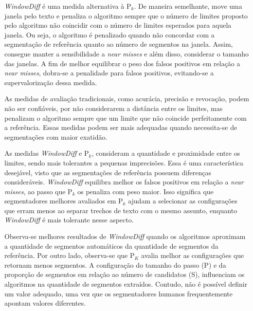 \textit{WindowDiff} é uma medida alternativa à P$_k$. %
De maneira semelhante, move uma janela pelo texto e penaliza o algoritmo sempre que o número de limites proposto pelo algoritmo não coincidir com o número de limites esperados para aquela janela. Ou seja, o algoritmo é penalizado quando não concordar com a segmentação de referência quanto ao número de segmentos na janela.  Assim, consegue manter a sensibilidade a \textit{near misses} e além disso, considerar o tamanho das janelas.  A fim de melhor equilibrar o peso dos falsos positivos em relação a \textit{near misses}, dobra-se a penalidade para falsos positivos, evitando-se a supervalorização dessa medida. 







As medidas de avaliação tradicionais, como acurácia, precisão e revocação, podem não ser confiáveis, por não considerarem a distância entre os limites, mas penalizam o algoritmo sempre que um limite que não coincide perfeitamente com a referência. Essas medidas podem ser mais adequadas quando necessita-se de segmentações com maior exatidão. 


As medidas \textit{WindowDiff} e P$_k$, consideram a quantidade e proximidade entre os limites, sendo mais tolerantes a pequenas imprecisões. Essa é uma característica desejável, visto que as segmentações de referência possuem diferenças consideráveis. 
%
\textit{WindowDiff} equilibra melhor os falsos positivos em relação a \textit{near misses}, ao passo que P$_k$ os penaliza com peso maior. Isso significa que segmentadores melhores avaliados em P$_k$ ajudam a selecionar as configurações que erram menos ao separar trechos de texto com o mesmo assunto, enquanto \textit{WindowDiff} é mais tolerante nesse aspecto.

Observa-se  melhores resultados de \textit{WindowDiff} quando os algoritmos aproximam a quantidade de segmentos automáticos da quantidade de segmentos da referência. %
Por outro lado, observa-se que P$_K$ avalia melhor as configurações que retornam menos segmentos. A configuração do tamanho do passo (P) e da proporção de segmentos em relação ao número de candidatos (S), influenciam os algoritmos na quantidade de segmentos extraídos. Contudo, não é possível definir um valor adequado, uma vez que os segmentadores humanos frequentemente apontam valores diferentes.



